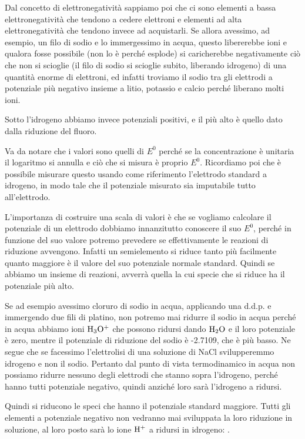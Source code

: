 Dal concetto di elettronegatività sappiamo poi che ci sono elementi a bassa elettronegatività che tendono a cedere elettroni e elementi ad alta elettronegatività che tendono invece ad acquistarli. Se allora avessimo, ad esempio, un filo di sodio e lo immergessimo in acqua, questo libererebbe ioni e qualora fosse possibile (non lo è perché esplode) si caricherebbe negativamente ciò che non si scioglie (il filo di sodio si scioglie subito, liberando idrogeno) di una quantità enorme di elettroni, ed infatti troviamo il sodio tra gli elettrodi a potenziale più negativo insieme a litio, potassio e calcio perché liberano molti ioni.

Sotto l'idrogeno abbiamo invece potenziali positivi, e il più alto è quello dato dalla riduzione del fluoro.

Va da notare che i valori sono quelli di $E^0$ perché se la concentrazione è unitaria il logaritmo si annulla e ciò che si misura è proprio $E^0$. Ricordiamo poi che è possibile misurare questo usando come riferimento l'elettrodo standard a idrogeno, in modo tale che il potenziale misurato sia imputabile tutto all'elettrodo.

L'importanza di costruire una scala di valori è che se vogliamo calcolare il potenziale di un elettrodo dobbiamo innanzitutto conoscere il suo $E^0$, perché in funzione del suo valore potremo prevedere se effettivamente le reazioni di riduzione avvengono. Infatti un semielemento si riduce tanto più facilmente quanto maggiore è il valore del suo potenziale normale standard. Quindi se abbiamo un insieme di reazioni, avverrà quella la cui specie che si riduce ha il potenziale più alto.

Se ad esempio avessimo cloruro di sodio in acqua, applicando una d.d.p. e immergendo due fili di platino, non potremo mai ridurre il sodio in acqua perché in acqua abbiamo ioni $\rm H_3O^+$ che possono ridursi dando $\rm H_2O$ e il loro potenziale è zero, mentre il potenziale di riduzione del sodio è -2.7109, che è più basso. Ne segue che se facessimo l'elettrolisi di una soluzione di NaCl svilupperemmo idrogeno e non il sodio. Pertanto dal punto di vista termodinamico in acqua non possiamo ridurre nessuno degli elettrodi che stanno sopra l'idrogeno, perché hanno tutti potenziale negativo, quindi anziché loro sarà l'idrogeno a ridursi.

\vspace{0.2cm}Quindi si riducono le speci che hanno il potenziale standard maggiore. Tutti gli elementi a potenziale negativo non vedranno mai sviluppata la loro riduzione in soluzione, al loro posto sarà lo ione $\rm H^+$ a ridursi in idrogeno: .

